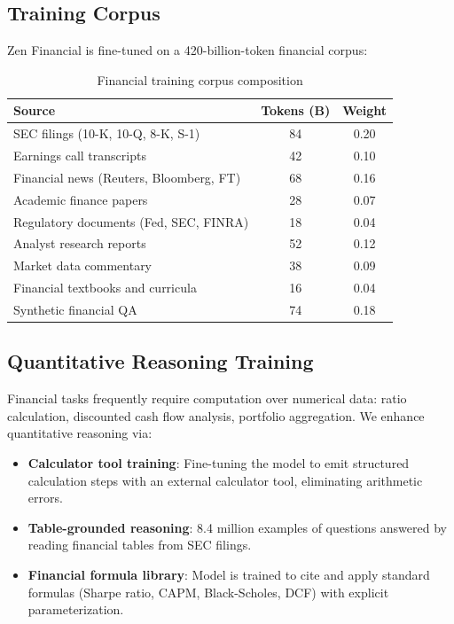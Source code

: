 \documentclass[11pt,a4paper]{article}
\begin{document}
\subsection{Training Corpus}

Zen Financial is fine-tuned on a 420-billion-token financial corpus:

\begin{table}[H]
\centering
\caption{Financial training corpus composition}
\label{tab:corpus}
\begin{tabular}{lcc}
\toprule
Source & Tokens (B) & Weight \\
\midrule
SEC filings (10-K, 10-Q, 8-K, S-1) & 84 & 0.20 \\
Earnings call transcripts & 42 & 0.10 \\
Financial news (Reuters, Bloomberg, FT) & 68 & 0.16 \\
Academic finance papers & 28 & 0.07 \\
Regulatory documents (Fed, SEC, FINRA) & 18 & 0.04 \\
Analyst research reports & 52 & 0.12 \\
Market data commentary & 38 & 0.09 \\
Financial textbooks and curricula & 16 & 0.04 \\
Synthetic financial QA & 74 & 0.18 \\
\bottomrule
\end{tabular}
\end{table}

\subsection{Quantitative Reasoning Training}

Financial tasks frequently require computation over numerical data: ratio calculation, discounted cash flow analysis, portfolio aggregation. We enhance quantitative reasoning via:

\begin{itemize}
  \item \textbf{Calculator tool training}: Fine-tuning the model to emit structured calculation steps with an external calculator tool, eliminating arithmetic errors.
  \item \textbf{Table-grounded reasoning}: 8.4 million examples of questions answered by reading financial tables from SEC filings.
  \item \textbf{Financial formula library}: Model is trained to cite and apply standard formulas (Sharpe ratio, CAPM, Black-Scholes, DCF) with explicit parameterization.
\end{itemize}
\end{document}
